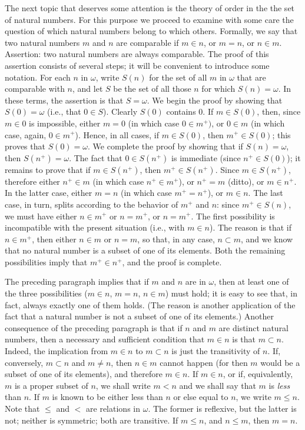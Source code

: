 The next topic that deserves some attention is the theory of order in the the set of natural numbers. For this purpose we proceed to examine with some care the question of which natural numbers belong to which others. Formally, we say that two natural numbers $m$ and $n$ are comparable if $m \in n$, or $m = n$, or $n \in m$. Assertion: two natural numbers are always comparable. The proof of this assertion consists of several steps; it will be convenient to introduce some notation. For each $n$ in $\omega$, write $S(n)$ for the set of all $m$ in $\omega$ that are comparable with $n$, and let $S$ be the set of all those $n$ for which $S(n) = \omega$. In these terms, the assertion is that $S = \omega$. We begin the proof by showing that $S(0) = \omega$ (i.e., that $0 \in S$). Clearly $S(0)$ contains $0$. If $m \in S(0)$, then, since $m \in 0$ is impossible, either $m = 0$ (in which case $0 \in m^{+})$, or $0 \in m$ (in which case, again, $0 \in m^{+}$). Hence, in all cases, if $m \in S(0)$, then $m^{+} \in S(0)$; this proves that $S(0) = \omega$. We complete the proof by showing that if $S(n) = \omega$, then $S(n^{+}) = \omega$. The fact that $0 \in S(n^{+})$ is immediate (since $n^{+} \in S(0)$); it remains to prove that if $m \in S(n^{+})$, then $m^{+} \in S(n^{+})$. Since $m \in S(n^{+})$, therefore either $n^{+} \in m$ (in which case $n^{+} \in m^{+}$), or $n^{+} = m$ (ditto), or $m \in n^{+}$. In the latter case, either $m = n$ (in which case $m^{+} = n^{+}$), or $m \in n$. The last case, in turn, splits according to the behavior of $m^{+}$ and $n$: since $m^{+} \in S(n)$, we must have either $n \in m^{+}$ or $n = m^{+}$, or $n = m^{+}$. The first possibility is incompatible with the present situation (i.e., with $m \in n$). The reason is that if $n \in m^{+}$, then either $n \in m$ or $n = m$, so that, in any case, $n \subset m$, and we know that no natural number is a subset of one of its elements. Both the remaining possibilities imply that $m^{+} \in n^{+}$, and the proof is complete. 

The preceding paragraph implies that if $m$ and $n$ are in $\omega$, then at least one of the three possibilities ($m \in n$, $m = n$, $n \in m$) must hold; it is easy to see that, in fact, always exactly one of them holds. (The reason is another application of the fact that a natural number is not a subset of one of its elements.) Another consequence of the preceding paragraph is that if $n$ and $m$ are distinct natural numbers, then a necessary and sufficient condition that $m \in n$ is that $m \subset n$. Indeed, the implication from $m \in n$ to $m \subset n$ is just the transitivity of $n$. If, conversely, $m \subset n$ and $m \neq n$, then $n \in m$ cannot happen (for then $m$ would be a subset of one of its elements), and therefore $m \in n$. If $m \in n$, or if, equivalently, $m$ is a proper subset of $n$, we shall write $m < n$ and we shall say that $m$ is \textit{less} than $n$. If $m$ is known to be either less than $n$ or else equal to $n$, we write $m \le n$. Note that $\le$ and $<$ are relations in $\omega$. The former is reflexive, but the latter is not; neither is symmetric; both are transitive. If $m \le n$, and $n \le m$, then $m = n$.

